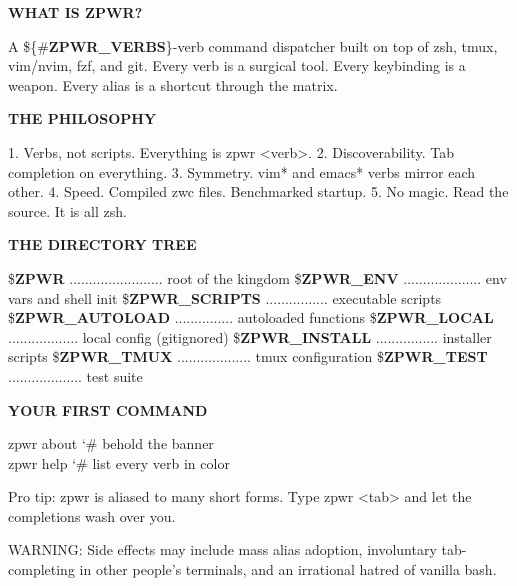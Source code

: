 \documentclass[11pt,a4paper,twoside]{book}
\begin{document}
\vspace{12pt}
{\bfseries\color{neonyellow} WHAT IS \textbf{ZPWR}?}\vspace{4pt}

A \$\{\#\textbf{ZPWR\_VERBS}\}-verb command dispatcher built on top of zsh, tmux, vim/nvim, fzf, and git. Every verb is a surgical tool. Every keybinding is a weapon. Every alias is a shortcut through the matrix.


\vspace{12pt}
{\bfseries\color{neonyellow} THE PHILOSOPHY}\vspace{4pt}

1. Verbs, not scripts. Everything is zpwr <verb>. 2. Discoverability.   Tab completion on everything. 3. Symmetry.          vim* and emacs* verbs mirror each other. 4. Speed.             Compiled zwc files. Benchmarked startup. 5. No magic.          Read the source. It is all zsh.


\vspace{12pt}
{\bfseries\color{neonyellow} THE DIRECTORY TREE}\vspace{4pt}

\$\textbf{ZPWR} ........................ root of the kingdom \$\textbf{ZPWR\_ENV} .................... env vars and shell init \$\textbf{ZPWR\_SCRIPTS} ................ executable scripts \$\textbf{ZPWR\_AUTOLOAD} ............... autoloaded functions \$\textbf{ZPWR\_LOCAL} .................. local config (gitignored) \$\textbf{ZPWR\_INSTALL} ................ installer scripts \$\textbf{ZPWR\_TMUX} ................... tmux configuration \$\textbf{ZPWR\_TEST} ................... test suite


\vspace{12pt}
{\bfseries\color{neonyellow} YOUR FIRST COMMAND}\vspace{4pt}

\begin{codebox}
\color{neongreen}zpwr about    {\char`\#} behold the banner\\
\color{neongreen}zpwr help     {\char`\#} list every verb in color\\
\end{codebox}

Pro tip: zpwr is aliased to many short forms. Type zpwr <tab> and let the completions wash over you.

WARNING: Side effects may include mass alias adoption, involuntary tab-completing in other people's terminals, and an irrational hatred of vanilla bash.


\vspace{16pt}
\end{document}
